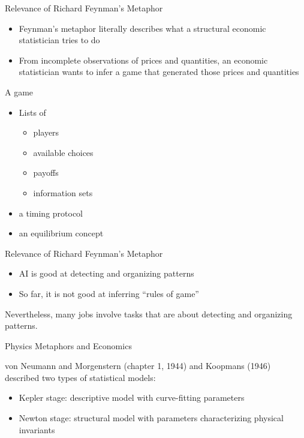 \documentclass[aspectratio=169]{beamer}
\theoremstyle{Definition}
\begin{document}
\begin{frame}{Relevance of Richard Feynman's Metaphor}
\begin{itemize}
\item Feynman's metaphor literally describes  what a structural economic statistician   tries  to do
\item From incomplete observations of prices and quantities, an economic statistician wants to infer a game that generated
those prices and quantities
\end{itemize}

\end{frame}

\begin{frame}{A game}
\begin{itemize}
\item Lists of
\begin{itemize} 
\item  players
\item  available choices
\item payoffs
\item information sets
\end{itemize}
\item a timing protocol
\item an equilibrium concept
\end{itemize}
\end{frame}



\begin{frame}{Relevance of Richard Feynman's Metaphor}
\begin{itemize}
\item AI is good at detecting and organizing patterns
\item So far, it is not good at inferring ``rules of game'' 
\end{itemize}
\bigskip

Nevertheless,  many jobs involve tasks that are about detecting and organizing patterns.

\end{frame}



\begin{frame}{Physics Metaphors and Economics}

von Neumann and Morgenstern (chapter 1, 1944) and Koopmans (1946) described two types of statistical models:
\begin{itemize}
\item Kepler stage: descriptive model with curve-fitting parameters
\item Newton stage: structural model with  parameters characterizing physical invariants  
\end{itemize}





\end{frame}
\end{document}
